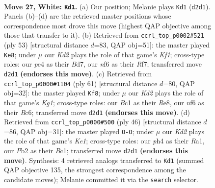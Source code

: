 \documentclass[11pt]{article}
\begin{document}
\clearpage

\begin{figure}[p]\centering
\begin{subfigure}{0.46\textwidth}\centering
\resizebox{\linewidth}{!}{%
\newchessgame
\chessboard[
  setfen={r3k2r/5p2/b4n2/8/p2pp2p/7P/PP1K1PB1/1RB4R w kq - 0 27},
  showmover=false,
  pgfstyle=straightmove, color=movearrow, markmove={d2-d1}
]}
\caption{}
\end{subfigure}\hfill
\begin{subfigure}{0.46\textwidth}\centering
\resizebox{\linewidth}{!}{%
\newchessgame
\chessboard[
  setfen={3r1k2/1p1b1rp1/4p2p/4P3/p3p1N1/6PP/PP3P2/2RR2K1 b - - 1 27},
  showmover=false,
  pgfstyle=straightmove, color=movearrow, markmove={f8-e8}
]}
\caption{}
\end{subfigure}
\\[4pt]
\begin{subfigure}{0.46\textwidth}\centering
\resizebox{\linewidth}{!}{%
\newchessgame
\chessboard[
  setfen={4r1k1/p6p/1pb2rp1/8/1PP1p3/2N1R2P/P5P1/3R2K1 b - - 1 31},
  showmover=false,
  pgfstyle=straightmove, color=movearrow, markmove={g8-f8}
]}
\caption{}
\end{subfigure}\hfill
\begin{subfigure}{0.46\textwidth}\centering
\resizebox{\linewidth}{!}{%
\newchessgame
\chessboard[
  setfen={r3k2r/1b3p2/1p6/4p1Pp/3nP2P/8/PP6/R1BBK2R w KQkq - 1 24},
  showmover=false,
  pgfstyle=straightmove, color=movearrow, markmove={e1-g1}
]}
\caption{}
\end{subfigure}
\caption{\textbf{Move 27, White: \texttt{Kd1}.} (a) Our position; Melanie plays \texttt{Kd1} (\texttt{d2d1}). Panels (b)--(d) are the retrieved master positions whose correspondence most drove this move (highest QAP objective among those that transfer to it). (b) Retrieved from \texttt{ccrl\_top\_p0002\#521} (ply 53) [structural distance $d$=83, QAP obj=51]: the master played \texttt{Ke8}; under $\mu$ our \emph{Kd2} plays the role of that game's \emph{Kf1}; cross-type roles: our \emph{p}e4 as their \emph{B}d7, our \emph{n}f6 as their \emph{R}f7; transferred move \texttt{d2d1} \textbf{(endorses this move)}. (c) Retrieved from \texttt{ccrl\_top\_p0000\#1104} (ply 61) [structural distance $d$=80, QAP obj=32]: the master played \texttt{Kf8}; under $\mu$ our \emph{Kd2} plays the role of that game's \emph{Kg1}; cross-type roles: our \emph{B}c1 as their \emph{R}e8, our \emph{n}f6 as their \emph{B}c6; transferred move \texttt{d2d1} \textbf{(endorses this move)}. (d) Retrieved from \texttt{ccrl\_top\_p0000\#500} (ply 46) [structural distance $d$=86, QAP obj=31]: the master played \texttt{O-O}; under $\mu$ our \emph{Kd2} plays the role of that game's \emph{Ke1}; cross-type roles: our \emph{p}h4 as their \emph{R}a1, our \emph{P}b2 as their \emph{B}c1; transferred move \texttt{d2d1} \textbf{(endorses this move)}. Synthesis: 4 retrieved analogs transferred to \texttt{Kd1} (summed QAP objective 135, the strongest correspondence among the candidate moves); Melanie committed it via the \texttt{search} selector.}
\label{fig:thought-m52}
\end{figure}
\end{document}

